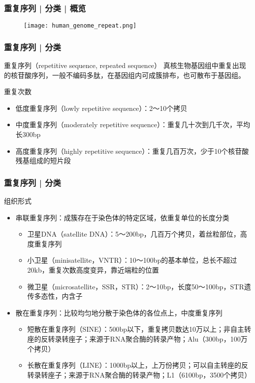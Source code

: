 \begin{frame}
  \frametitle{重复序列 | 分类 | 概览}
  \begin{figure}
    \centering
    \texttt{[image: human\_genome\_repeat.png]}
  \end{figure}
\end{frame}

\begin{frame}
  \frametitle{重复序列 | \alert{分类}}
  \begin{block}{重复序列（repetitive sequence, repeated sequence）}
    真核生物基因组中重复出现的核苷酸序列，一般不编码多肽，在基因组内可成簇排布，也可散布于基因组。
  \end{block}
  \pause
  \begin{block}{重复次数}
    \begin{itemize}
      \item 低度重复序列（lowly repetitive sequence）：2～10个拷贝
      \item 中度重复序列（moderately repetitive sequence）：重复几十次到几千次，平均长300bp
      \item 高度重复序列（highly repetitive sequence）：重复几百万次，少于10个核苷酸残基组成的短片段
    \end{itemize}
  \end{block}
\end{frame}

\begin{frame}
  \frametitle{重复序列 | \alert{分类}}
  \begin{block}{组织形式}
    \begin{itemize}
      \item 串联重复序列：成簇存在于染色体的特定区域，依重复单位的长度分类
        \begin{itemize}
          \item 卫星DNA（satellite DNA）：5～200bp，几百万个拷贝，着丝粒部位，高度重复序列
          \item 小卫星（minisatellite，VNTR）：10～100bp的基本单位，总长不超过20kb，重复次数高度变异，靠近端粒的位置
          \item 微卫星（microsatellite，SSR，STR）：2～10bp，长度50～100bp，STR遗传多态性，内含子
        \end{itemize}
      \item 散在重复序列：比较均匀地分散于染色体的各位点上，中度重复序列
        \begin{itemize}
          \item 短散在重复序列（SINE）：500bp以下，重复拷贝数达10万以上；非自主转座的反转录转座子；来源于RNA聚合酶的转录产物；Alu（300bp，100万个拷贝）
          \item 长散在重复序列（LINE）：1000bp以上，上万份拷贝；可以自主转座的反转录转座子；来源于RNA聚合酶的转录产物；L1（6100bp，3500个拷贝）
        \end{itemize}
    \end{itemize}
  \end{block}
\end{frame}

